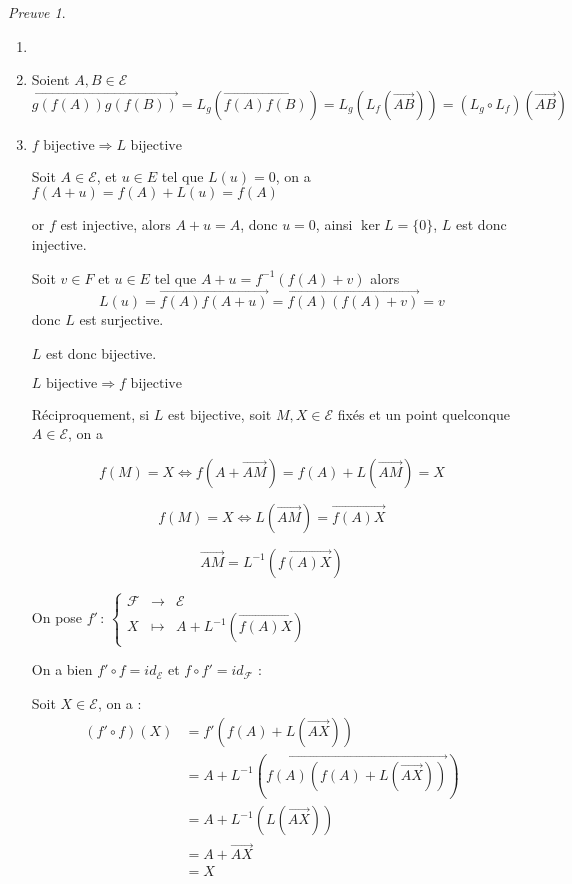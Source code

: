 \documentclass[]{article}
\theoremstyle{remark}
\newtheorem{myproof}{Preuve}
\theoremstyle{definition}
\newcommand{\func}[5]{
#1 \, : \, \left\{ \begin{array}{lcl}
	#2 & \longrightarrow & #3 \\
	#4 & \longmapsto & #5
\end{array}
\right.
}
\newenvironment{proofpart}[1]{
	\noindent
	{\textbf{\boldmath #1}}
}{
	\checkmark
}
\begin{document}
\begin{myproof}
	\leavevmode
	
	\begin{enumerate}
		\item \checkmark
		\item Soient $A, B \in \mathcal{E}$ $$\overrightarrow{g(f(A)) g(f(B))} = L_g(\overrightarrow{f(A) f(B)}) = L_g(L_f(\overrightarrow{AB})) = (L_g \circ L_f)(\overrightarrow{AB})$$
		\item
		\begin{proofpart}{$f \text{ bijective} \Longrightarrow L \text{ bijective}$}
		
			Soit $A \in \mathcal{E}$, et $u \in E$ tel que $L(u)=0$, on a $f(A + u) = f(A) + L(u) = f(A)$
			
			or $f$ est injective, alors $A+u = A$, donc $u = 0$, ainsi $\ker L = \{0\}$, $L$ est donc injective.
			
			Soit $v \in F$ et $u \in E$ tel que $A + u = f^{-1}(f(A) + v)$ alors $$L(u) = \overrightarrow{f(A)f(A+u)} =  \overrightarrow{f(A)(f(A)+v)} = v$$ donc $L$ est surjective.
			
			$L$ est donc bijective.

		\end{proofpart}

		\begin{proofpart}{$L \text{ bijective} \Longrightarrow f \text{ bijective}$}
			
			Réciproquement, si $L$ est bijective, soit $M,X \in \mathcal{E}$ fixés et un point quelconque $A \in \mathcal{E}$, on a
			
			$$f(M) = X \Longleftrightarrow f(A + \overrightarrow{AM}) = f(A) + L(\overrightarrow{AM}) = X$$
			
			$$f(M) = X \Longleftrightarrow L(\overrightarrow{AM}) = \overrightarrow{f(A)X}$$
			
			$$\overrightarrow{AM} = L^{-1}(\overrightarrow{f(A)X})$$
			
			On pose $\func{f'}{\mathcal{F}}{\mathcal{E}}{X}{A + L^{-1}(\overrightarrow{f(A)X})}$
	
			On a bien $f'\circ f = id_{\mathcal{E}}$ et $f \circ f' = id_{\mathcal{F}}$ :
			
			Soit $X \in \mathcal{E}$, on a :
			$$
			\begin{aligned}
				(f' \circ f)(X) &= f'\left(f(A)+L\left(\overrightarrow{AX}\right)\right)\\
				&=A+L^{-1}\left(\overrightarrow{f(A)\left(f(A)+L\left(\overrightarrow{AX}\right)\right)}\right)\\
				&=A+L^{-1}\left(L\left(\overrightarrow{AX}\right)\right)\\
				&=A+\overrightarrow{AX}\\
				&=X
			\end{aligned}$$
			

\end{proofpart}
\end{enumerate}
\end{myproof}
\end{document}
